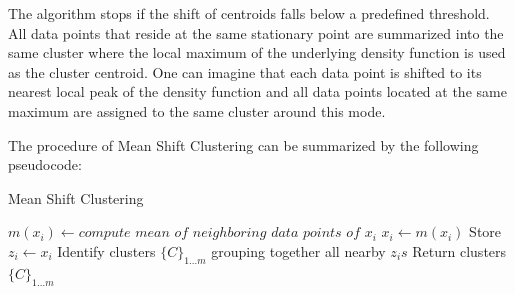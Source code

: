 The algorithm stops if the shift of centroids falls below a predefined threshold. All data points that reside at the same stationary point are summarized into the same cluster where the local maximum of the underlying density function is used as the cluster centroid. 
One can imagine that each data point is shifted to its nearest local peak of the density function and all data points located at the same maximum are assigned to the same cluster around this mode.

The procedure of Mean Shift Clustering can be summarized by the following pseudocode:
\begin{algorithm}[H]
	\caption{Mean Shift Clustering} 
	\begin{algorithmic}[1]
				\State $m(x_{i})\leftarrow compute$ $mean$ $of$ $neighboring$ $data$ $points$ $of$ $x_{i}$
				\State $x_{i}\leftarrow m(x_{i})$
			\EndWhile
			\State Store $z_{i}\leftarrow x_{i}$ 
		\EndFor
		\State Identify clusters $\{C\}_{1\ldots m}$ grouping together all nearby $z_{i}s$ 
		\State Return clusters $\{C\}_{1 \ldots m}$
	\end{algorithmic} 
\end{algorithm}

